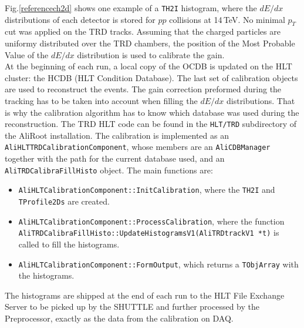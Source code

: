 \documentclass{alicetdr}
\begin{document}
Fig.\ref{referencech2d} shows one example of a {\tt TH2I} histogram,
where the $dE/dx$ distributions of each detector is stored for $pp$
collisions at 14\,TeV. No minimal $p_{T}$ cut was applied on the
TRD tracks. Assuming that the charged particles are uniformy
distributed over the TRD chambers, the position of the Most Probable
Value of the $dE/dx$ distribution is used to calibrate the gain.\\
At the beginning of each run, a local copy of the OCDB is updated
on the HLT cluster: the HCDB (HLT Condition Database). The last set
of calibration objects are used to reconstruct the events. The gain
correction preformed during the tracking has to be taken into account
when filling the $dE/dx$ distributions. That is why the calibration
algorithm has to know which database was used during the
reconstruction. The TRD HLT code can be found in the {\tt HLT/TRD}
subdirectory of the AliRoot installation. The calibration is
implemented as an {\tt AliHLTTRDCalibrationComponent}, whose members
are an {\tt AliCDBManager} together with the path for the current
database used, and an {\tt AliTRDCalibraFillHisto} object. The main
functions are:
\begin{itemize}
\item {\tt AliHLTCalibrationComponent::InitCalibration}, where the
{\tt TH2I} and {\tt TProfile2Ds} are created.
\item {\tt AliHLTCalibrationComponent::ProcessCalibration}, where
the function\\
{\tt AliTRDCalibraFillHisto::UpdateHistogramsV1(AliTRDtrackV1 *t)}
is called to fill the histograms.
\item {\tt AliHLTCalibrationComponent::FormOutput}, which returns
a {\tt TObjArray} with the histograms.
\end{itemize}
The histograms are shipped at the end of each run to the HLT File
Exchange Server to be picked up by the SHUTTLE and further processed
by the Preprocessor, exactly as the data from the calibration on DAQ.
%
\end{document}

